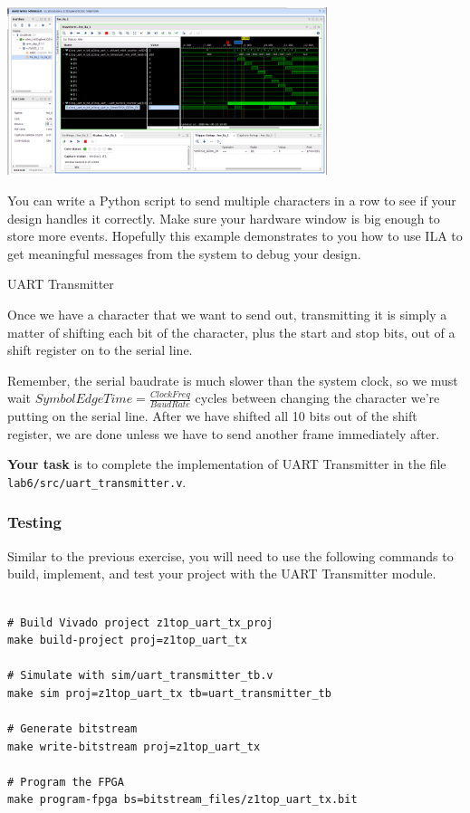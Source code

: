\documentclass[11pt]{article}
\makeatletter
\renewcommand{\subsection}
{\@startsection {subsection}{1}{0pt}
 {-1ex}
 {0.5ex}
 {\bfseries\normalsize}}
\makeatother
\begin{document}
\begin{center}
\includegraphics[width=0.7\textwidth]{figs/vivado-ila-9.png}
\end{center}

You can write a Python script to send multiple characters in a row to see if your design handles it correctly. Make sure your hardware window is big enough to store more events. Hopefully this example demonstrates to you how to use ILA to get meaningful messages from the system to debug your design.

\subsection{UART Transmitter}

Once we have a character that we want to send out, transmitting it is simply a matter of shifting each bit of the character, plus the start and stop bits, out of a shift register on to the serial line.

Remember, the serial baudrate is much slower than the system clock, so we must wait $SymbolEdgeTime = \frac{ClockFreq}{BaudRate}$ cycles between changing the character we're putting on the serial line.
After we have shifted all 10 bits out of the shift register, we are done unless we have to send another frame immediately after.

\textbf{Your task} is to complete the implementation of UART Transmitter in the file \verb|lab6/src/uart_transmitter.v|.

\subsubsection{Testing}

Similar to the previous exercise, you will need to use the following commands to build, implement, and test your project with the UART Transmitter module.

\begin{verbatim}

# Build Vivado project z1top_uart_tx_proj
make build-project proj=z1top_uart_tx

# Simulate with sim/uart_transmitter_tb.v
make sim proj=z1top_uart_tx tb=uart_transmitter_tb

# Generate bitstream
make write-bitstream proj=z1top_uart_tx

# Program the FPGA
make program-fpga bs=bitstream_files/z1top_uart_tx.bit
\end{verbatim}
\end{document}
